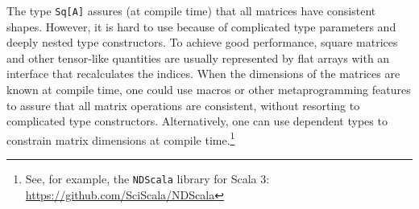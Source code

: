 The type \lstinline!Sq[A]! assures (at compile time) that all matrices
have consistent shapes. However, it is hard to use because of complicated
type parameters and deeply nested type constructors. To achieve good
performance, square matrices and other tensor-like quantities are
usually represented by flat arrays with an interface that recalculates
the indices. When the dimensions of the matrices are known at compile
time, one could use macros or other metaprogramming features to assure
that all matrix operations are consistent, without resorting to complicated
type constructors. Alternatively, one can use dependent types to constrain
matrix dimensions at compile time.\footnote{See, for example, the \texttt{NDScala} library for Scala 3: \href{https://github.com/SciScala/NDScala}{https://github.com/SciScala/NDScala}}
\begin{comment}
this is chapter 9 of the functional programming tutorial traversable
functors to motivate the interrupted introduction of these factors
into practice I always remember the example that you have a list of
some data items and you want to process it by using a function like
this where you have a future as a as a result of this function and
the usual way of doing this in Scala is to use a function called future
dot sequence and I have seen this I have shown this in a previous
tutorial and the idea is that you want to process each element of
this list with this function and you have to wait until the entire
list is done so we have many separate computations for each element
of the list encapsulated by the future for each one of them you want
to wait until the entire list is done and basically this is the type
signature that you want in order to implement this computation you
have a list of a you have a function from a to future B and you want
to get a list of B as a result and you can get it in the future so
you have a future of lists of it as a result and that is the type
signature that the function future that sequence will allow you to
have with some work but in order to understand what this kind of computation
does we want to generalize from the future to an arbitrary type constructor
F and we want to understand what properties these type constructors
must answer so the list we have L and instead the future we have F
and the type signature of the function is like this so this function
is called Traverse I believe there\textsf{'}s also a future of traders with
a type signature like this that works on sequences we want to generalize
to some type constructors F and L and that\textsf{'}s what we will be able

\end{comment}

